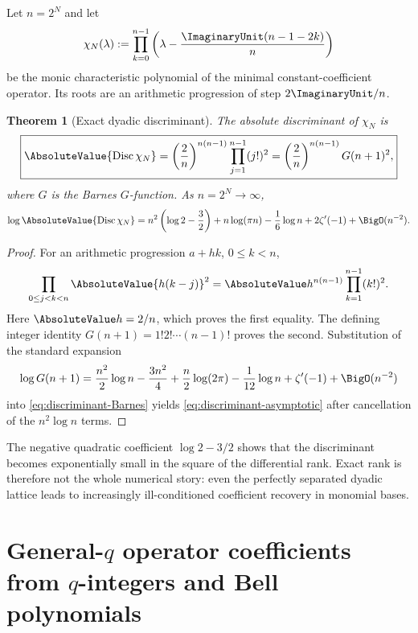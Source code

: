 \documentclass[11pt]{article}
\numberwithin{equation}{section}
\newtheorem{theorem}{Theorem}[section]
\theoremstyle{definition}
\theoremstyle{remark}
\DeclareMathOperator{\Disc}{Disc}
\begin{document}
Let $n=2^N$ and let
\begin{equation}
 \chi_N(\lambda):=
 \prod_{k=0}^{n-1}
 \left(\lambda-\frac{\ImaginaryUnit(n-1-2k)}{n}\right)
 \label{eq:dyadic-characteristic-poly}
\end{equation}
be the monic characteristic polynomial of the minimal constant-coefficient
operator.  Its roots are an arithmetic progression of step $2\ImaginaryUnit/n$.

\begin{theorem}[Exact dyadic discriminant]
\label{thm:dyadic-discriminant}
The absolute discriminant of $\chi_N$ is
\begin{equation}
 \boxed{
 \AbsoluteValue{\Disc\chi_N}
 =\left(\frac{2}{n}\right)^{n(n-1)}
   \prod_{j=1}^{n-1}(j!)^2
 =\left(\frac{2}{n}\right)^{n(n-1)}G(n+1)^2,}
 \label{eq:discriminant-Barnes}
\end{equation}
where $G$ is the Barnes $G$-function.  As $n=2^N\to\infty$,
\begin{equation}
 \log\AbsoluteValue{\Disc\chi_N}
 =n^2\left(\log2-\frac32\right)
  +n\log(\pi n)-\frac16\log n+2\zeta'(-1)
  +\BigO(n^{-2}).
 \label{eq:discriminant-asymptotic}
\end{equation}
\end{theorem}
\begin{proof}
For an arithmetic progression $a+hk$, $0\le k<n$,
\[
 \prod_{0\le j<k<n}\AbsoluteValue{h(k-j)}^2
 =\AbsoluteValue h^{n(n-1)}\prod_{k=1}^{n-1}(k!)^2.
\]
Here $\AbsoluteValue h=2/n$, which proves the first equality.  The defining integer
identity $G(n+1)=1!2!\cdots(n-1)!$ proves the second.  Substitution of the
standard expansion
\[
 \log G(n+1)=\frac{n^2}{2}\log n-\frac{3n^2}{4}
 +\frac n2\log(2\pi)-\frac1{12}\log n+\zeta'(-1)
 +\BigO(n^{-2})
\]
into \eqref{eq:discriminant-Barnes} yields
\eqref{eq:discriminant-asymptotic} after cancellation of the $n^2\log n$
terms.
\end{proof}

The negative quadratic coefficient $\log2-3/2$ shows that the discriminant
becomes exponentially small in the square of the differential rank.  Exact
rank is therefore not the whole numerical story: even the perfectly separated
dyadic lattice leads to increasingly ill-conditioned coefficient recovery in
monomial bases.

\section{General-\texorpdfstring{$q$}{q} operator coefficients from \texorpdfstring{$q$}{q}-integers and Bell polynomials}
\label{sec:general-q-coefficients}
\end{document}
